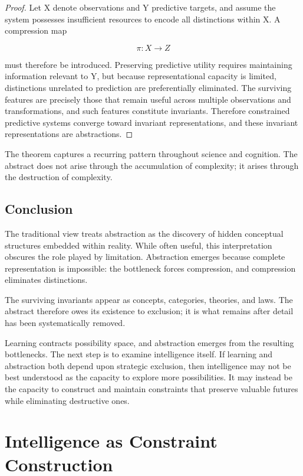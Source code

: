 \documentclass[11pt,oneside]{book}
\theoremstyle{plain}
\theoremstyle{definition}
\theoremstyle{remark}
\begin{document}
\begin{proof}
Let X denote observations and Y predictive targets, and assume the system possesses insufficient resources to encode all distinctions within X. A compression map

\begin{equation}
\pi : X
\rightarrow Z
\end{equation}

must therefore be introduced. Preserving predictive utility requires maintaining information relevant to Y, but because representational capacity is limited, distinctions unrelated to prediction are preferentially eliminated. The surviving features are precisely those that remain useful across multiple observations and transformations, and such features constitute invariants. Therefore constrained predictive systems converge toward invariant representations, and these invariant representations are abstractions.
\end{proof}

The theorem captures a recurring pattern throughout science and cognition. The abstract does not arise through the accumulation of complexity; it arises through the destruction of complexity.

\section{Conclusion}

The traditional view treats abstraction as the discovery of hidden conceptual structures embedded within reality. While often useful, this interpretation obscures the role played by limitation. Abstraction emerges because complete representation is impossible: the bottleneck forces compression, and compression eliminates distinctions.

The surviving invariants appear as concepts, categories, theories, and laws. The abstract therefore owes its existence to exclusion; it is what remains after detail has been systematically removed.

Learning contracts possibility space, and abstraction emerges from the resulting bottlenecks. The next step is to examine intelligence itself. If learning and abstraction both depend upon strategic exclusion, then intelligence may not be best understood as the capacity to explore more possibilities. It may instead be the capacity to construct and maintain constraints that preserve valuable futures while eliminating destructive ones.

\chapter{Intelligence as Constraint Construction}
\end{document}
